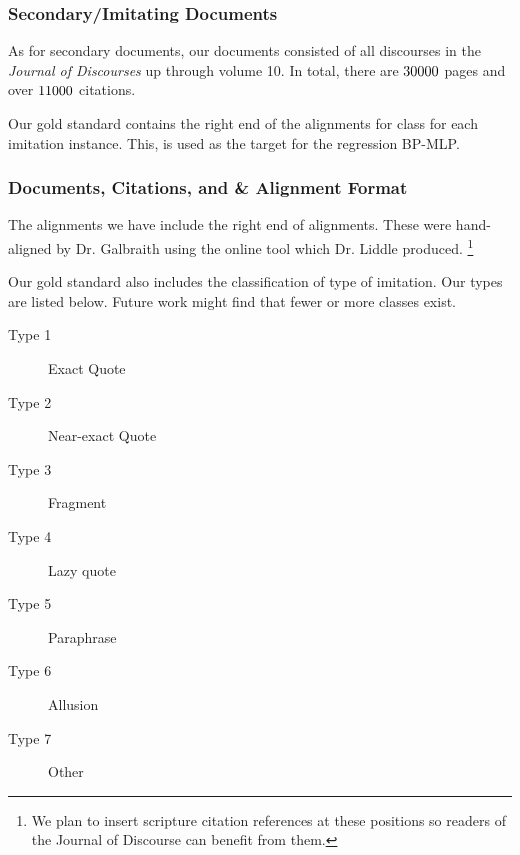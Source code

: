 \subsubsection{Secondary/Imitating Documents}
As for secondary documents, our documents consisted of all discourses in the \textit{Journal of Discourses} up through volume 10. In total, there are $30000$ pages and over $11000$ citations.

Our gold standard contains the right end of the alignments for class for each imitation instance. This, is used as the target for the regression BP-MLP. %


\subsubsection{Documents, Citations, and \& Alignment Format}
The alignments we have include the right end of alignments. These were hand-aligned by Dr. Galbraith using the online tool which Dr. Liddle produced. \footnote{We plan to insert scripture citation references at these positions so readers of the Journal of Discourse can benefit from them.}

Our gold standard also includes the classification of type of imitation. Our types are listed below. Future work might find that fewer or more classes exist.

	\begin{description}
		\item [Type 1] Exact Quote
		\item [Type 2] Near-exact Quote
		\item [Type 3] Fragment
		\item [Type 4] Lazy quote
		\item [Type 5] Paraphrase
		\item [Type 6] Allusion
		\item [Type 7] Other%
	\end{description}

